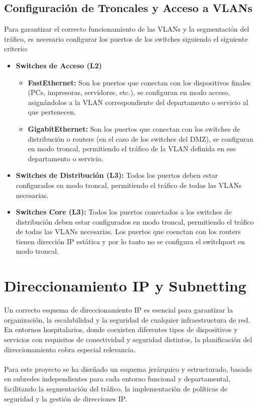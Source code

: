 \subsection{Configuración de Troncales y Acceso a VLANs}
Para garantizar el correcto funcionamiento de las VLANs y la segmentación del tráfico, es necesario configurar los puertos de los switches siguiendo el siguiente criterio:
\begin{itemize}
    \item \textbf{Switches de Acceso (L2)} 
    \begin{itemize}
        \item \textbf{FastEthernet:} Son los puertos que conectan con los dispositivos finales (PCs, impresoras, servidores, etc.), se configuran en modo acceso, asignándolos a la VLAN correspondiente 
        del departamento o servicio al que pertenecen.
        \item \textbf{GigabitEthernet:} Son los puertos que conectan con los switches de distribución o routers (en el caso de los switches del DMZ), se configuran en modo troncal, permitiendo el tráfico de la VLAN definida en ese departamento o servicio.
    \end{itemize}
    \item \textbf{Switches de Distribución (L3):} Todos los puertos deben estar configurados en modo troncal, permitiendo el tráfico de todas las VLANs necesarias.
    \item \textbf{Switches Core (L3):} Todos los puertos conectados a los switches de distribución deben estar configurados en modo troncal, permitiendo el tráfico de todas las VLANs necesarias. Los puertos que coenctan con los routers 
    tienen dirección IP estática y por lo tanto no se configura el switchport en modo troncal.
\end{itemize}

\section{Direccionamiento IP y Subnetting}
Un correcto esquema de direccionamiento IP es esencial para garantizar la organización, la escalabilidad y la seguridad de cualquier infraestructura de red. En entornos 
hospitalarios, donde coexisten diferentes tipos de dispositivos y servicios con requisitos de conectividad y seguridad distintos, la planificación del direccionamiento 
cobra especial relevancia.
\\ \\
Para este proyecto se ha diseñado un esquema jerárquico y estructurado, basado en subredes independientes para cada entorno funcional y departamental, facilitando la 
segmentación del tráfico, la implementación de políticas de seguridad y la gestión de direcciones IP.

